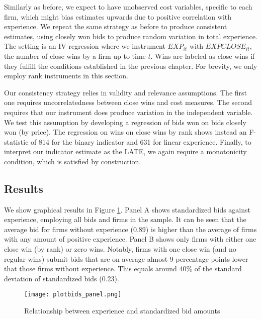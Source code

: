 Similarly as before, we expect to have unobserved cost variables, specific to each firm, which might bias estimates upwards due to positive correlation with experience. We repeat the same strategy as before to produce consistent estimates, using closely won bids to produce random variation in total experience. The setting is an IV regression where we instrument $EXP_{it}$ with $EXPCLOSE_{it}$, the number of close wins by a firm up to time $t$. Wins are labeled as close wins if they fulfill the conditions established in the  previous chapter. For brevity, we only employ rank instruments in this section. %

Our consistency strategy relies in validity and relevance assumptions. The first one requires uncorrelatedness between close wins and cost measures. The second requires that our instrument does produce variation in the independent variable. We test this assumption by developing a regression of bids won on bids closely won (by price). The regression on wins on close wins by rank shows instead an F-statistic of 814 for the binary indicator and 631 for linear experience. Finally, to interpret our indicator estimate as the LATE, we again require a monotonicity condition, which is satisfied by construction.
%
\subsection{Results}
We show graphical results in Figure \ref{fig:plotbids_panel}. Panel A shows standardized bids against experience, employing all bids and firms in the sample. It can be seen that the average bid for firms without experience (0.89) is higher than the average of firms with any amount of positive experience. Panel B shows only firms with either one close win (by rank) or zero wins. Notably, firms with one close win (and no regular wins) submit bids that are on average almost 9 percentage points lower that those firms without experience. This equals around 40\%  of the standard deviation of standardized bids (0.23).

\begin{figure}[H]
  \texttt{[image: plotbids\_panel.png]}
  \caption{Relationship between experience and standardized bid amounts}
  \label{fig:plotbids_panel}
\end{figure}

